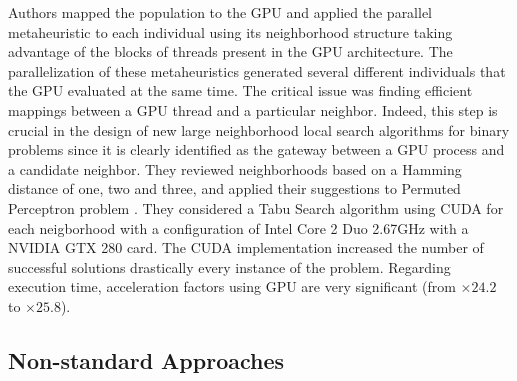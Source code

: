 \documentclass{comjnl}
\begin{document}
Authors mapped the population to the GPU and applied the parallel metaheuristic to each individual using its neighborhood structure taking advantage of the blocks of threads present in the GPU architecture. The parallelization of these metaheuristics generated several different individuals that the GPU evaluated at the same time. The critical issue was finding efficient mappings between a GPU thread and a particular neighbor. Indeed, this step is crucial in the design of new large neighborhood local search algorithms for binary problems since it is clearly identified as the gateway between a GPU process and a candidate neighbor. They reviewed neighborhoods based on a Hamming distance of one, two and three, and applied their suggestions to Permuted Perceptron problem \cite{KnudsenPermutedPerceptronProblem1999}. They considered a Tabu Search algorithm \cite{TaillardTabySearch1991} using CUDA for each neigborhood with a configuration of Intel Core 2 Duo 2.67GHz with a NVIDIA GTX 280 card. The CUDA implementation increased the number of successful solutions drastically every instance of the problem. Regarding execution time, acceleration factors using GPU are very significant (from $\times24.2$ to $\times25.8$).


\subsection{Non-standard Approaches}
\end{document}

